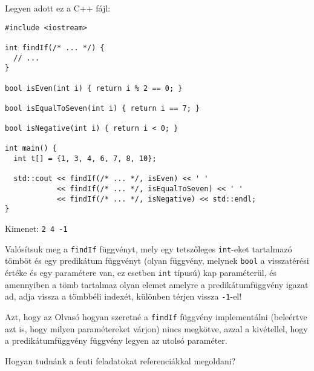 \documentclass[../exercise_book/exercise_book.tex]{subfiles}
\begin{document}
	\begin{exercise}
		Legyen adott ez a C++ fájl:
		
		\smallskip
		\begin{lstlisting}
#include <iostream>

int findIf(/* ... */) {
  // ...
}

bool isEven(int i) { return i % 2 == 0; }

bool isEqualToSeven(int i) { return i == 7; }

bool isNegative(int i) { return i < 0; }

int main() {
  int t[] = {1, 3, 4, 6, 7, 8, 10};

  std::cout << findIf(/* ... */, isEven) << ' '
            << findIf(/* ... */, isEqualToSeven) << ' '
            << findIf(/* ... */, isNegative) << std::endl;
}
		\end{lstlisting}
		Kimenet: \texttt{2 4 -1}
		
		\smallskip
		Valósítsuk meg a \texttt{findIf} függvényt, mely egy tetszőleges \texttt{int}-eket tartalmazó tömböt és egy predikátum függvényt (olyan függvény, melynek \texttt{bool} a visszatérési értéke és egy paramétere van, ez esetben \texttt{int} típusú) kap paraméterül, és amennyiben a tömb tartalmaz olyan elemet amelyre a predikátumfüggvény igazat ad, adja vissza a tömbbéli indexét, különben térjen vissza \texttt{-1}-el!
		
		Azt, hogy az Olvasó hogyan szeretné a \texttt{findIf} függvény implementálni (beleértve azt is, hogy milyen paramétereket várjon) nincs megkötve, azzal a kivétellel, hogy a predikátumfüggvény függvény legyen az utolsó paraméter.
	\end{exercise}
	\begin{exercise}
		Hogyan tudnánk a fenti feladatokat referenciákkal megoldani?
	\end{exercise}
\end{document}

